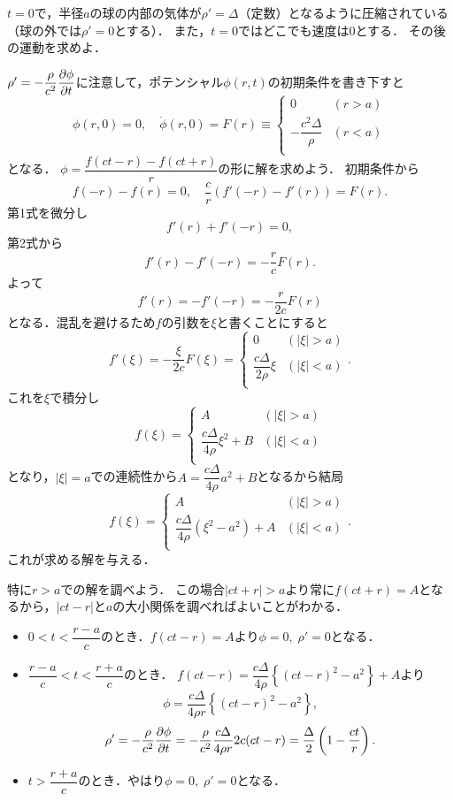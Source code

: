 
\begin{mondai}{}{}
$t=0$で，半径$a$の球の内部の気体が$\rho'=\Delta$（定数）となるように圧縮されている（球の外では$\rho'=0$とする）．
また，$t=0$ではどこでも速度は0とする．
その後の運動を求めよ．
\end{mondai}
\begin{kaitou}

$\rho'=-\dfrac{\rho}{c^2}\dpdv{\phi}{t}$に注意して，ポテンシャル$\phi(r,t)$の初期条件を書き下すと
\[
    \phi(r,0) = 0, \quad
    \dot{\phi}(r,0) = F(r) \equiv \begin{cases}
        0 & (r>a) \\[8pt]
        -\dfrac{c^2\Delta}{\rho} & (r<a) \\[8pt]
    \end{cases}
\]
となる．
$\phi = \dfrac{f(ct-r) - f(ct+r)}{r}$の形に解を求めよう．
初期条件から
\[
    f(-r) - f(r) = 0, \quad
    \frac{c}{r} \left( f'(-r)-f'(r) \right) = F(r).
\]
第1式を微分し
\[
    f'(r) + f'(-r) = 0,
\]
第2式から
\[
    f'(r)-f'(-r) = -\frac{r}{c} F(r).
\]
よって
\[
    f'(r) = - f'(-r) = -\frac{r}{2c} F(r)
\]
となる．混乱を避けるため$f$の引数を$\xi$と書くことにすると
\[
    f'(\xi) = -\frac{\xi}{2c} F(\xi) = 
    \begin{cases}
        0 & (|\xi|>a) \\[8pt]
        \dfrac{c\Delta}{2\rho} \xi & (|\xi|<a) \\[8pt]
    \end{cases}.
\]
これを$\xi$で積分し
\[
    f(\xi) =
    \begin{cases}
        A & (|\xi|>a) \\[8pt]
        \dfrac{c\Delta}{4\rho} \xi^2 + B & (|\xi|<a) \\[8pt]
    \end{cases}
\]
となり，$|\xi|=a$での連続性から$A = \dfrac{c\Delta}{4\rho} a^2 + B$となるから結局
\[
    f(\xi) =
    \begin{cases}
        A & (|\xi|>a) \\[8pt]
        \dfrac{c\Delta}{4\rho} (\xi^2-a^2) + A & (|\xi|<a) \\[8pt]
    \end{cases}.
\]
これが求める解を与える．


特に$r>a$での解を調べよう．
この場合$|ct+r|>a$より常に$f(ct+r)=A$となるから，$|ct-r|$と$a$の大小関係を調べればよいことがわかる．
\begin{itemize}
    \item $0 < t < \dfrac{r-a}{c}$のとき．$f(ct-r)=A$より$\phi=0, \; \rho'=0$となる．
    \item $\dfrac{r-a}{c} < t < \dfrac{r+a}{c}$のとき．
        $f(ct-r) = \dfrac{c\Delta}{4\rho} \left\{ (ct-r)^2 - a^2 \right\} + A $より
        \[ 
            \phi = \frac{c\Delta}{4\rho r} \left\{ (ct-r)^2 - a^2 \right\} ,
        \]
        \[ 
            \rho' = -\frac{\rho}{c^2} \pdv{\phi}{t} = -\frac{\rho}{c^2} \frac{c\Delta}{4\rho r} 2c(ct-r)
            = \frac{\Delta}{2} \left( 1-\frac{ct}{r} \right).
        \]
    \item $t > \dfrac{r+a}{c}$のとき．やはり$\phi=0, \; \rho'=0$となる．
\end{itemize}


\end{kaitou}
